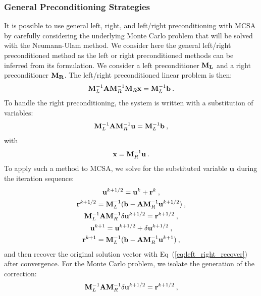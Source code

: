 \subsubsection{General Preconditioning Strategies}
\label{subsubsec:general_mcsa_preconditioning}
It is possible to use general left, right, and left/right
preconditioning with MCSA by carefully considering the underlying
Monte Carlo problem that will be solved with the Neumann-Ulam
method. We consider here the general left/right preconditioned method
as the left or right preconditioned methods can be inferred from its
formulation. We consider a left preconditioner $\mathbf{M_L}$ and a right
preconditioner $\mathbf{M_R}$. The left/right preconditioned linear
problem is then:
\begin{equation}
  \mathbf{M}_L^{-1}\mathbf{A}\mathbf{M}_R^{-1}\mathbf{M}_R\mathbf{x} = \mathbf{M}_L^{-1}\mathbf{b}\:.
  \label{eq:left_right_linear_problem}
\end{equation}
To handle the right preconditioning, the system is written with a
substitution of variables:
\begin{equation}
  \mathbf{M}_L^{-1}\mathbf{A}\mathbf{M}_R^{-1}\mathbf{u} = \mathbf{M}_L^{-1}\mathbf{b}\:,
  \label{eq:left_right_subs_problem}
\end{equation}
with
\begin{equation}
  \mathbf{x} = \mathbf{M}_R^{-1}\mathbf{u}\:.
  \label{eq:left_right_recover}
\end{equation}
To apply such a method to MCSA, we solve for the substituted variable
$\mathbf{u}$ during the iteration sequence:
\begin{subequations}
  \begin{gather}
    \mathbf{u}^{k+1/2} = \mathbf{u}^k + \mathbf{r}^k\:,\\
    \mathbf{r}^{k+1/2} = \mathbf{M}_L^{-1}(\mathbf{b}-\mathbf{A}\mathbf{M}_R^{-1}\mathbf{u}^{k+1/2})\:,\\ 
    \mathbf{M}_L^{-1}\mathbf{A}\mathbf{M}_R^{-1}\delta\mathbf{u}^{k+1/2} = \mathbf{r}^{k+1/2}\:,\\ 
    \mathbf{u}^{k+1} = \mathbf{u}^{k+1/2} + \delta \mathbf{u}^{k+1/2}\:,\\
    \mathbf{r}^{k+1} = \mathbf{M}_L^{-1}(\mathbf{b}-\mathbf{A}\mathbf{M}_R^{-1}\mathbf{u}^{k+1})\:,
  \end{gather}
  \label{eq:left_right_mcsa}
\end{subequations}
and then recover the original solution vector with
Eq~(\ref{eq:left_right_recover}) after convergence. For the Monte
Carlo problem, we isolate the generation of the correction:
\begin{equation}
  \mathbf{M}_L^{-1}\mathbf{A}\mathbf{M}_R^{-1}\delta\mathbf{u}^{k+1/2} = \mathbf{r}^{k+1/2}\:,
  \label{eq:left_right_correction}
\end{equation}
